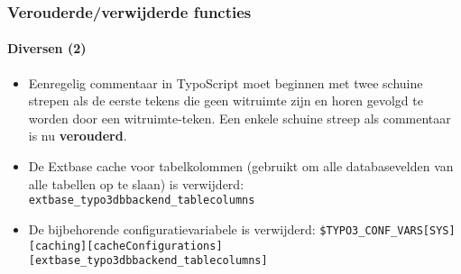 
\begin{frame}[fragile]
	\frametitle{Verouderde/verwijderde functies}
	\framesubtitle{Diversen (2)}

	\begin{itemize}

		\item Eenregelig commentaar in TypoScript moet beginnen met twee schuine strepen als de eerste tekens die geen witruimte zijn
			en horen gevolgd te worden door een witruimte-teken. Een enkele schuine streep als commentaar is nu \textbf{verouderd}.

		\item De Extbase cache voor tabelkolommen (gebruikt om alle databasevelden van alle tabellen op te slaan)
			is verwijderd:\newline
			\texttt{extbase\_typo3dbbackend\_tablecolumns}

		\item De bijbehorende configuratievariabele is verwijderd:
			\smaller
				\texttt{\$TYPO3\_CONF\_VARS[SYS][caching][cacheConfigurations]}\newline
				\tabto{0.4cm}\texttt{[extbase\_typo3dbbackend\_tablecolumns]}
			\normalsize

	\end{itemize}

\end{frame}

